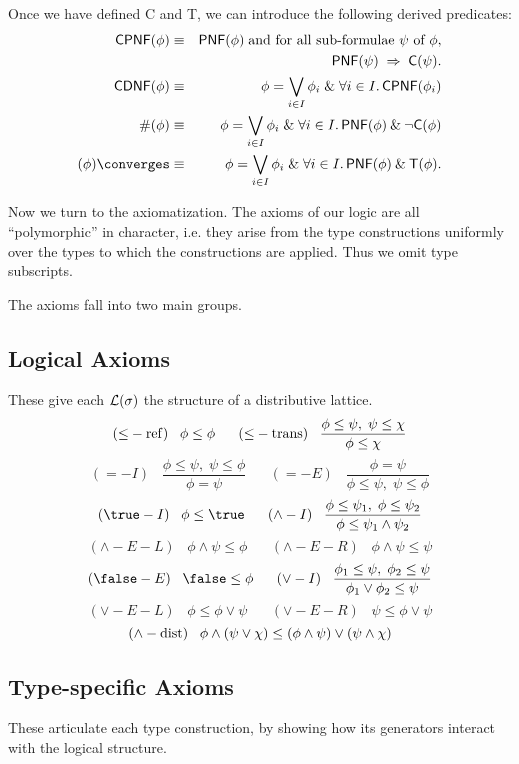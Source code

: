 Once we have defined {\sf C} and {\sf T}, we can introduce the following derived predicates:
\begin{eqnarray*}
{\sf CPNF}(\phi) & \equiv & {\sf PNF}(\phi ) \; \mbox{and for all sub-formulae
$\psi$ of $\phi$,} \\
& &  {\sf PNF}(\psi ) \; \Rightarrow \; {\sf C}(\psi ) . \\
{\sf CDNF}(\phi ) & \equiv & \phi = \bigvee_{i \in I} \phi_{i} \; \& \; \forall   i \in I. \, {\sf CPNF}(\phi_{i}) \\
\#(\phi ) & \equiv & \phi = \bigvee_{i \in I} \phi_{i} \; \& \; \forall i \in I. \, {\sf PNF}(\phi ) \: \& \: \neg {\sf C}(\phi ) \\ 
(\phi ) \converges  & \equiv & \phi = \bigvee_{i \in I} \phi_{i} \; \& \; \forall i \in I. \, {\sf PNF}(\phi ) \: \& \: {\sf T}(\phi ).
\end{eqnarray*}

Now we turn to the axiomatization.
The axioms of our logic are all ``polymorphic'' in character,
i.e. they arise from the type constructions uniformly over
the types to which the constructions are applied.
Thus we omit type subscripts.

The axioms fall into two main groups.
\subsection*{Logical Axioms}
These give each $\cal L (\sigma )$ the structure of a distributive
lattice.
\[ ({\leq}-{\rm ref}) \;\;\; \phi \leq \phi \;\;\;\;\;\;
({\leq}-{\rm trans}) \;\;\;  \frac{\phi \leq \psi , \; \psi \leq \chi}
{\phi \leq \chi} \]
\[ ({=}-I) \;\;\; \frac{\phi \leq \psi , \; \psi \leq \phi}{\phi = \psi} 
\;\;\;\;\;\;
({=}-E) \;\;\; \frac{\phi = \psi}{\phi \leq \psi , \; \psi \leq \phi} \]
\[ ({\true}-I) \;\;\; \phi \leq \true \;\;\;\;\;\;	
({\wedge}-I) \;\;\; \frac{\phi \leq \psi_{1} , \; \phi \leq \psi_{2}}
{\phi \leq \psi_1 \wedge \psi_2} \]
\[ ({\wedge}-E-L) \;\;\; \phi \wedge \psi \leq \phi \;\;\;\;\;\; 
({\wedge}-E-R) \;\;\; \phi \wedge \psi \leq \psi  \]
\[ ({\false}-E) \;\;\; \false \leq \phi \;\;\;\;\;\;
({\vee}-I) \;\;\; \frac{\phi_{1} \leq \psi , \; \phi_{2} \leq \psi}
{\phi_{1} \vee \phi_{2} \leq \psi} \]
\[ ({\vee}-E-L) \;\;\; \phi \leq \phi \vee \psi \;\;\;\;\;\;
({\vee}-E-R) \;\;\; \psi \leq \phi \vee \psi \]  
\[ ({\wedge}-{\rm dist}) \;\;\; \phi \wedge (\psi \vee \chi )  \leq  
(\phi \wedge \psi )
\vee (\psi \wedge \chi ) \]

\subsection*{Type-specific Axioms}
These articulate each type construction, by showing how its generators
interact with the logical structure.

